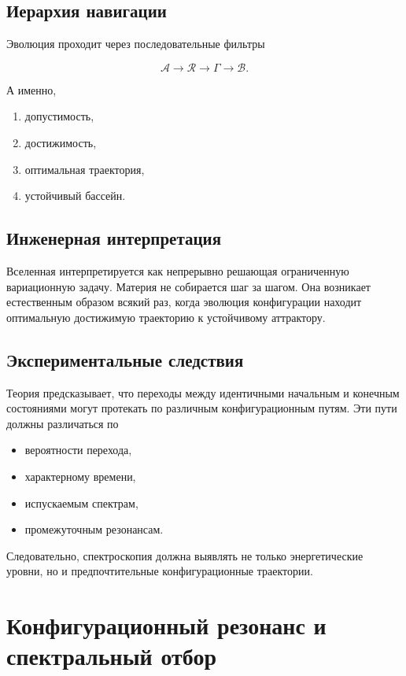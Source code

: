 \section{Иерархия навигации}

Эволюция проходит через последовательные фильтры

\[ \boxed{ \mathcal A \rightarrow \mathcal R \rightarrow \Gamma \rightarrow \mathcal B. } \]

А именно,

\begin{enumerate}
\item допустимость,
\item достижимость,
\item оптимальная траектория,
\item устойчивый бассейн.
\end{enumerate}

\section{Инженерная интерпретация}

Вселенная интерпретируется как непрерывно решающая ограниченную вариационную задачу. Материя не собирается шаг за шагом. Она возникает естественным образом всякий раз, когда эволюция конфигурации находит оптимальную достижимую траекторию к устойчивому аттрактору.

\section{Экспериментальные следствия}

Теория предсказывает, что переходы между идентичными начальным и конечным состояниями могут протекать по различным конфигурационным путям. Эти пути должны различаться по

\begin{itemize}
\item вероятности перехода,
\item характерному времени,
\item испускаемым спектрам,
\item промежуточным резонансам.
\end{itemize}

Следовательно, спектроскопия должна выявлять не только энергетические уровни, но и предпочтительные конфигурационные траектории.

\chapter{Конфигурационный резонанс и спектральный отбор}

